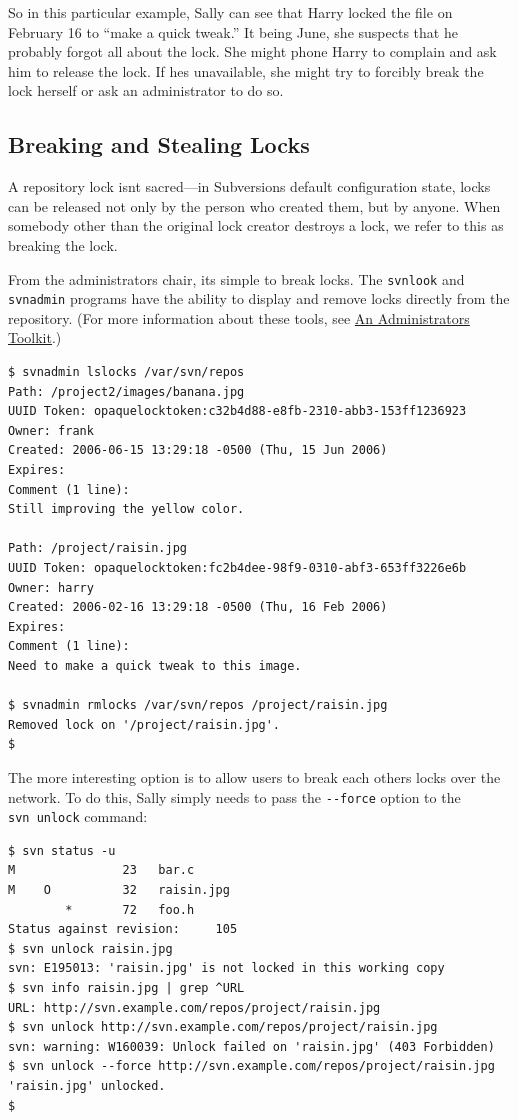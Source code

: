 So in this particular example, Sally can see that Harry locked the file
on February 16 to ``make a quick tweak.'' It being June, she suspects
that he probably forgot all about the lock. She might phone Harry to
complain and ask him to release the lock. If he\textquotesingle s
unavailable, she might try to forcibly break the lock herself or ask an
administrator to do so.

\subsection{Breaking and Stealing
Locks}\label{svn.advanced.locking.break-steal}

A repository lock isn\textquotesingle t sacred---in
Subversion\textquotesingle s default configuration state, locks can be
released not only by the person who created them, but by anyone. When
somebody other than the original lock creator destroys a lock, we refer
to this as breaking the lock.

From the administrator\textquotesingle s chair, it\textquotesingle s
simple to break locks. The \texttt{svnlook} and \texttt{svnadmin}
programs have the ability to display and remove locks directly from the
repository. (For more information about these tools, see
\hyperref[svn.reposadmin.maint.tk]{An Administrator\textquotesingle s
Toolkit}.)

\begin{verbatim}
$ svnadmin lslocks /var/svn/repos
Path: /project2/images/banana.jpg
UUID Token: opaquelocktoken:c32b4d88-e8fb-2310-abb3-153ff1236923
Owner: frank
Created: 2006-06-15 13:29:18 -0500 (Thu, 15 Jun 2006)
Expires: 
Comment (1 line):
Still improving the yellow color.

Path: /project/raisin.jpg
UUID Token: opaquelocktoken:fc2b4dee-98f9-0310-abf3-653ff3226e6b
Owner: harry
Created: 2006-02-16 13:29:18 -0500 (Thu, 16 Feb 2006)
Expires: 
Comment (1 line):
Need to make a quick tweak to this image.

$ svnadmin rmlocks /var/svn/repos /project/raisin.jpg
Removed lock on '/project/raisin.jpg'.
$
\end{verbatim}

The more interesting option is to allow users to break each
other\textquotesingle s locks over the network. To do this, Sally simply
needs to pass the \texttt{-\/-force} option to the \texttt{svn\ unlock}
command:

\begin{verbatim}
$ svn status -u
M               23   bar.c
M    O          32   raisin.jpg
        *       72   foo.h
Status against revision:     105
$ svn unlock raisin.jpg
svn: E195013: 'raisin.jpg' is not locked in this working copy
$ svn info raisin.jpg | grep ^URL
URL: http://svn.example.com/repos/project/raisin.jpg
$ svn unlock http://svn.example.com/repos/project/raisin.jpg
svn: warning: W160039: Unlock failed on 'raisin.jpg' (403 Forbidden)
$ svn unlock --force http://svn.example.com/repos/project/raisin.jpg
'raisin.jpg' unlocked.
$
\end{verbatim}

